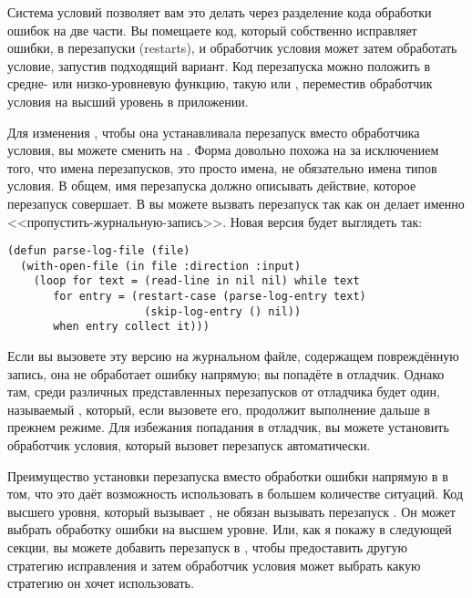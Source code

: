 Система условий позволяет вам это делать через разделение кода обработки ошибок на две
части. Вы помещаете код, который собственно исправляет ошибки, в перезапуски (restarts), и
обработчик условия может затем обработать условие, запустив подходящий вариант. Код
перезапуска можно положить в средне- или низко-уровневую функцию, такую
 или , переместив обработчик условия на высший
уровень в приложении.

Для изменения , чтобы она устанавливала перезапуск вместо обработчика
условия, вы можете сменить  на . Форма
 довольно похожа на  за исключением того, что имена
перезапусков, это просто имена, не обязательно имена типов условия. В общем, имя
перезапуска должно описывать действие, которое перезапуск совершает. В
 вы можете вызвать перезапуск  так как он делает
именно <<пропустить-журнальную-запись>>. Новая версия будет выглядеть так:

\begin{lstlisting}
(defun parse-log-file (file)
  (with-open-file (in file :direction :input)
    (loop for text = (read-line in nil nil) while text
       for entry = (restart-case (parse-log-entry text)
                     (skip-log-entry () nil))
       when entry collect it)))
\end{lstlisting}

Если вы вызовете эту версию  на журнальном файле, содержащем
повреждённую запись, она не обработает ошибку напрямую; вы попадёте в отладчик. Однако
там, среди различных представленных перезапусков от отладчика будет один, называемый
, который, если вызовете его, продолжит выполнение
 дальше в прежнем режиме. Для избежания попадания в отладчик, вы
можете установить обработчик условия, который вызовет перезапуск 
автоматически.

Преимущество установки перезапуска вместо обработки ошибки напрямую в
 в том, что это даёт возможность использовать  в
большем количестве ситуаций. Код высшего уровня, который вызывает ,
не обязан вызывать перезапуск . Он может выбрать обработку ошибки на
высшем уровне. Или, как я покажу в следующей секции, вы можете добавить перезапуск в
, чтобы предоставить другую стратегию исправления и затем обработчик
условия может выбрать какую стратегию он хочет использовать.

